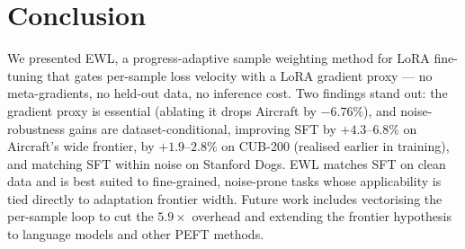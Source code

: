 \section{Conclusion}
\label{sec:conclusion}

We presented EWL, a progress-adaptive sample weighting method for LoRA
fine-tuning that gates per-sample loss velocity with a LoRA gradient proxy ---
no meta-gradients, no held-out data, no inference cost.
Two findings stand out: the gradient proxy is essential (ablating it drops
Aircraft by $-6.76\%$), and noise-robustness gains are dataset-conditional,
improving SFT by $+4.3$--$6.8\%$ on Aircraft's wide frontier, by
$+1.9$--$2.8\%$ on CUB-200 (realised earlier in training), and matching SFT
within noise on Stanford Dogs.
EWL matches SFT on clean data and is best suited to fine-grained, noise-prone
tasks whose applicability is tied directly to adaptation frontier width.
Future work includes vectorising the per-sample loop to cut the $5.9\times$
overhead and extending the frontier hypothesis to language models and other
PEFT methods.


